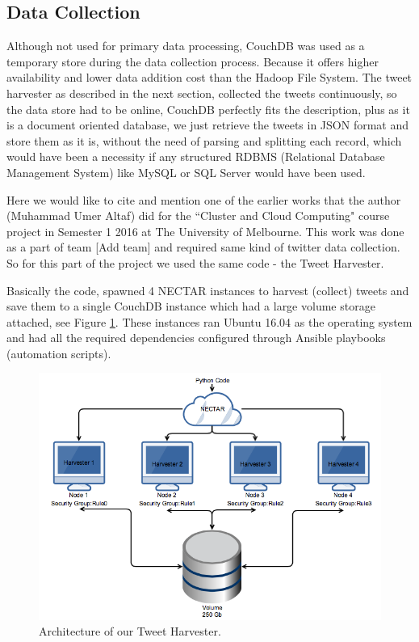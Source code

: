 \documentclass[12pt]{report}
\begin{document}
\subsection{Data Collection}
Although not used for primary data processing, CouchDB was used as a temporary store during the data collection process. Because it offers higher availability and lower data addition cost than the Hadoop File System. The tweet harvester as described in the next section, collected the tweets continuously, so the data store had to be online, CouchDB perfectly fits the description, plus as it is a document oriented database, we just retrieve the tweets in JSON format and store them as it is, without the need of parsing and splitting each record, which would have been a necessity if any structured RDBMS (Relational Database Management System) like MySQL or SQL Server would have been used.

Here we would like to cite and mention one of the earlier works that the author (Muhammad Umer Altaf) did for the ``Cluster and Cloud Computing" course project in Semester 1 2016 at The University of Melbourne. This work was done as a part of team [Add team] and required same kind of twitter data collection. So for this part of the project we used the same code - the Tweet Harvester.

Basically the code, spawned 4 NECTAR instances to harvest (collect) tweets and save them to a single CouchDB instance which had a large volume storage attached, see Figure \ref{fig:tweetHarvester}. These instances ran Ubuntu 16.04 as the operating system and had all the required dependencies configured through Ansible playbooks (automation scripts).


\begin{figure}[ht]
\centering
        \includegraphics[width=120mm,scale=1]{Images/TweetHarvesting.png}
    \caption{Architecture of our Tweet Harvester.}
    \label{fig:tweetHarvester}
\end{figure}
\end{document}
